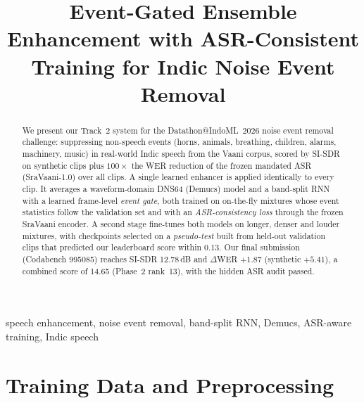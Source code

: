 \documentclass[conference]{IEEEtran}
\begin{document}
\title{Event-Gated Ensemble Enhancement with ASR-Consistent Training for Indic Noise Event Removal}

\author{
}

\maketitle

\begin{abstract}
We present our Track~2 system for the Datathon@IndoML~2026 noise event removal challenge: suppressing non-speech
events (horns, animals, breathing, children, alarms, machinery, music) in real-world Indic speech from the Vaani
corpus, scored by SI-SDR on synthetic clips plus $100\times$ the WER reduction of the frozen mandated ASR
(SraVaani-1.0) over all clips. A single learned enhancer is applied identically to every clip. It averages a
waveform-domain DNS64 (Demucs) model and a band-split RNN with a learned frame-level \emph{event gate}, both trained
on on-the-fly mixtures whose event statistics follow the validation set and with an \emph{ASR-consistency loss}
through the frozen SraVaani encoder. A second stage fine-tunes both models on longer, denser and louder mixtures,
with checkpoints selected on a \emph{pseudo-test} built from held-out validation clips that predicted our
leaderboard score within 0.13. Our final submission (Codabench 995085) reaches SI-SDR 12.78\,dB and $\Delta$WER
$+1.87$ (synthetic $+5.41$), a combined score of 14.65 (Phase~2 rank~13), with the hidden ASR audit passed.
\end{abstract}

\begin{IEEEkeywords}
speech enhancement, noise event removal, band-split RNN, Demucs, ASR-aware training, Indic speech
\end{IEEEkeywords}

\section{Training Data and Preprocessing}
\end{document}
